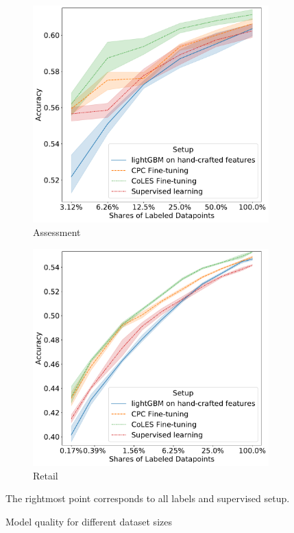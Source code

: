 \documentclass[sigconf, anonymous]{acmart}
\begin{document}
\begin{figure}
\begin{subfigure}{0.25\linewidth}
  \end{subfigure}%
  \begin{subfigure}{0.25\linewidth}
    \caption{Assessment}
    \includegraphics[width=\linewidth]{figures/ss_bowl2019_per.pdf}
  \end{subfigure}%
  \begin{subfigure}{0.25\linewidth}
    \caption{Retail}
    \includegraphics[width=\linewidth]{figures/ss_x5_per.pdf}
  \end{subfigure}
  \caption{
    Model quality for different dataset sizes
  }
  \small{The rightmost point corresponds to all labels and supervised setup.}
  \label{fig-semi-main}
\end{figure}
\end{document}
